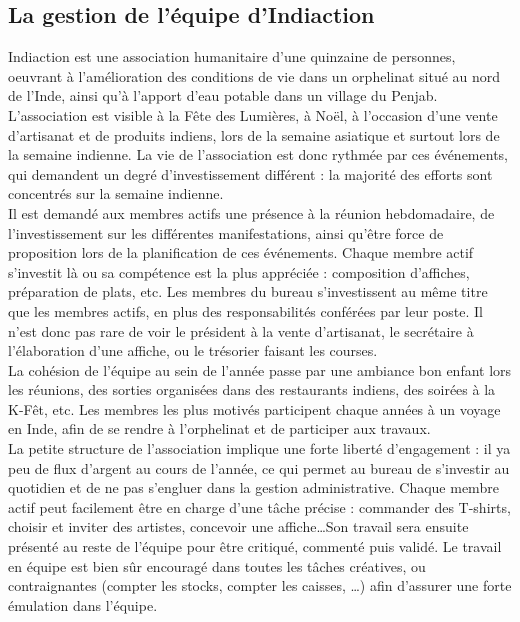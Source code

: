 \subsection{La gestion de l'équipe d'Indiaction}
Indiaction est une association humanitaire d'une quinzaine de personnes, oeuvrant à l'amélioration des conditions de vie dans un orphelinat situé au nord de l'Inde, ainsi qu'à l'apport d'eau potable dans un village du Penjab. L'association est visible à la Fête des Lumières, à Noël, à l'occasion d'une vente d'artisanat et de produits indiens, lors de la semaine asiatique et surtout lors de la semaine indienne. La vie de l'association est donc rythmée par ces événements, qui demandent un degré d'investissement différent : la majorité des efforts sont concentrés sur la semaine indienne.\\

Il est demandé aux membres actifs une présence à la réunion hebdomadaire, de l'investissement sur les différentes manifestations, ainsi qu'être force de proposition lors de la planification de ces événements. Chaque membre actif s'investit là ou sa compétence est la plus appréciée  : composition d'affiches, préparation de plats, etc. Les membres du bureau s'investissent au même titre que les membres actifs, en plus des responsabilités conférées par leur poste. Il n'est donc pas rare de voir le président à la vente d'artisanat, le secrétaire à l'élaboration d'une affiche, ou le trésorier faisant les courses.\\

La cohésion de l'équipe au sein de l'année passe par une ambiance \og bon enfant \fg{}{} lors les réunions, des sorties organisées dans des restaurants indiens, des soirées à la K-Fêt, etc. Les membres les plus motivés participent chaque années à un voyage en Inde, afin de se rendre à l'orphelinat et de participer aux travaux.\\

La petite structure de l'association implique une forte liberté d'engagement : il ya peu de flux d'argent au cours de l'année, ce qui permet au bureau de s'investir au quotidien et de ne pas s'\og engluer \fg{} dans la gestion administrative. Chaque membre actif peut facilement être en charge d'une tâche précise : commander des T-shirts, choisir et inviter des artistes, concevoir une affiche\ldots Son travail sera ensuite présenté au reste de l'équipe pour être critiqué, commenté puis validé. Le travail en équipe est bien sûr encouragé dans toutes les tâches créatives, ou contraignantes (compter les stocks, compter les caisses, \ldots) afin d'assurer une forte émulation dans l'équipe.


